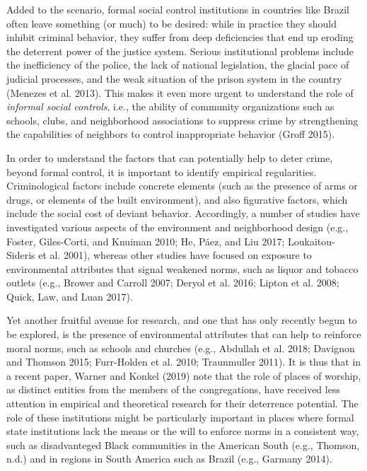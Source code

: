 \documentclass[smallextended]{svjour3}       %
\begin{document}
Added to the scenario, formal social control institutions in countries
like Brazil often leave something (or much) to be desired: while in
practice they should inhibit criminal behavior, they suffer from deep
deficiencies that end up eroding the deterrent power of the justice
system. Serious institutional problems include the inefficiency of the
police, the lack of national legislation, the glacial pace of judicial
processes, and the weak situation of the prison system in the country
(Menezes et al. 2013). This makes it even more urgent to understand the
role of \emph{informal social controls}, i.e., the ability of community
organizations such as schools, clubs, and neighborhood associations to
suppress crime by strengthening the capabilities of neighbors to control
inappropriate behavior (Groff 2015).

In order to understand the factors that can potentially help to deter
crime, beyond formal control, it is important to identify empirical
regularities. Criminological factors include concrete elements (such as
the presence of arms or drugs, or elements of the built environment),
and also figurative factors, which include the social cost of deviant
behavior. Accordingly, a number of studies have investigated various
aspects of the environment and neighborhood design (e.g., Foster,
Giles-Corti, and Knuiman 2010; He, Páez, and Liu 2017; Loukaitou-Sideris
et al. 2001), whereas other studies have focused on exposure to
environmental attributes that signal weakened norms, such as liquor and
tobacco outlets (e.g., Brower and Carroll 2007; Deryol et al. 2016;
Lipton et al. 2008; Quick, Law, and Luan 2017).

Yet another fruitful avenue for research, and one that has only recently
begun to be explored, is the presence of environmental attributes that
can help to reinforce moral norms, such as schools and churches (e.g.,
Abdullah et al. 2018; Davignon and Thomson 2015; Furr-Holden et al.
2010; Traunmuller 2011). It is thus that in a recent paper, Warner and
Konkel (2019) note that the role of places of worship, as distinct
entities from the members of the congregations, have received less
attention in empirical and theoretical research for their deterrence
potential. The role of these institutions might be particularly
important in places where formal state institutions lack the means or
the will to enforce norms in a consistent way, such as disadvanteged
Black communities in the American South (e.g., Thomson, n.d.) and in
regions in South America such as Brazil (e.g., Garmany 2014).
\end{document}
